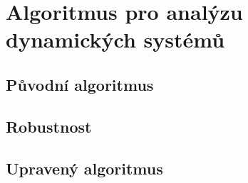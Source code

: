 \chapter{Algoritmus pro analýzu dynamických systémů}
\section{Původní algoritmus}
\section{Robustnost}
\section{Upravený algoritmus}
